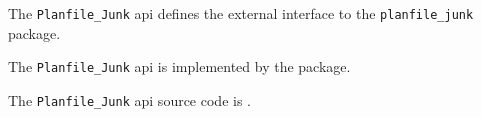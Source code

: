 The {\tt Planfile\_Junk} api defines the external interface to the {\tt planfile\_junk} package.

The {\tt Planfile\_Junk} api is implemented by the  package.

The {\tt Planfile\_Junk} api source code is .


